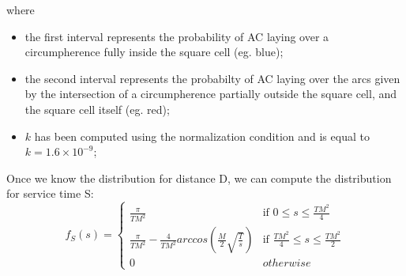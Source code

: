 \documentclass[a4paper,12pt]{article}
\begin{document}
where
\begin{itemize}
  \item the first interval represents the probability of AC laying over a circumpherence fully inside the square cell (eg. blue);
  \item the second interval represents the probabilty of AC laying over the arcs given by the intersection of a circumpherence partially outside the square cell, and the square cell itself (eg. red);
  \item $k$ has been computed using the normalization condition and is equal to $k = 1.6 \times 10^{-9}$;
\end{itemize}

Once we know the distribution for distance D, we can compute the distribution for service time S:
$$
f_S(s) = \begin{cases}
\frac{\pi}{TM^2}  & \mbox{if } 0 \leq s \leq \frac{TM^2}{4} \\
\frac{\pi}{TM^2} - \frac{4}{TM^2} arccos\left( \frac{M}{2} \sqrt{\frac{T}{s}} \right) & \mbox{if } \frac{TM^2}{4} \leq s \leq \frac{TM^2}{2} \\
0 & otherwise
\end{cases}
$$
\end{document}
